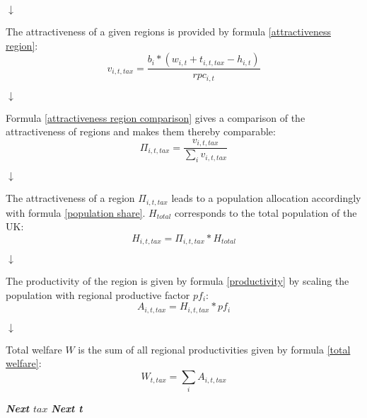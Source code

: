 \documentclass[10pt,a4]{article}
\begin{document}
\begin{center}
\begin{center}
    $\downarrow$
\end{center}
The attractiveness of a given regions is provided by formula \ref{attractiveness region}: 
\begin{equation}
    v_{i,t,tax} = \frac{b_i*(w_{i,t}+t_{i,t,tax}-h_{i,t})}{rpc_{i,t}}
    \label{attractiveness region}
\end{equation}

\begin{center}
    $\downarrow$
\end{center}
Formula \ref{attractiveness region comparison} gives a comparison of the attractiveness of regions and makes them thereby comparable:
\begin{equation}
    \Pi_{i,t,tax} = \frac{v_{i,t,tax}}{\sum_i v_{i,t,tax}}
    \label{attractiveness region comparison}
\end{equation}

\begin{center}
    $\downarrow$
\end{center}
The attractiveness of a region $\Pi_{i,t,tax}$ leads to a population allocation accordingly with formula \ref{population share}. $H_{total}$ corresponds to the total population of the UK:
\begin{equation}
    H_{i,t,tax} = \Pi_{i,t,tax} * H_{total}
    \label{population share}
\end{equation}

\begin{center}
    $\downarrow$
\end{center}
The productivity of the region is given by formula \ref{productivity} by scaling the population with regional productive factor $pf_i$:
\begin{equation}
    A_{i,t,tax} = H_{i,t,tax} * pf_i
    \label{productivity}
\end{equation}

\begin{center}
    $\downarrow$
\end{center}
Total welfare $W$ is the sum of all regional productivities given by formula \ref{total welfare}:
\begin{equation}
    W_{t,tax} = \sum_i A_{i,t,tax}
    \label{total welfare}
\end{equation}
\end{center}
\textbf{\textit{Next $tax$}}
\newline
\textbf{\textit{Next t}}
\end{document}
